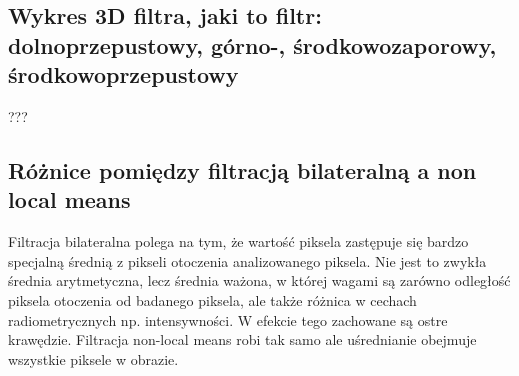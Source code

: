 \documentclass[a4paper, 12pt, titlepage]{article}
\begin{document}
\subsection{Wykres 3D filtra, jaki to filtr: dolnoprzepustowy, górno-, środkowozaporowy, środkowoprzepustowy}
???

\subsection{Różnice pomiędzy filtracją bilateralną a non local means}
Filtracja bilateralna polega na tym, że wartość piksela zastępuje się bardzo specjalną średnią z pikseli otoczenia analizowanego piksela. Nie jest to zwykła średnia arytmetyczna, lecz średnia ważona, w której wagami są zarówno odległość piksela otoczenia od badanego piksela, ale także różnica w cechach radiometrycznych np. intensywności. W efekcie tego zachowane są ostre krawędzie. 
Filtracja non-local means robi tak samo ale uśrednianie obejmuje wszystkie piksele w obrazie. 


\end{document}
